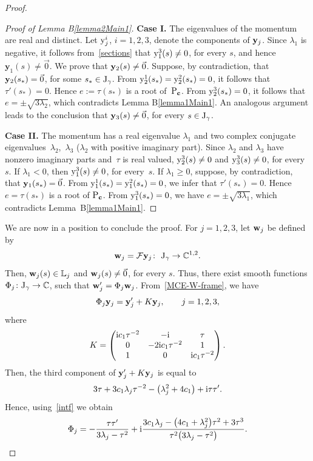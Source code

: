 \documentclass[10pt,a4paper]{amsart}
\numberwithin{equation}{section}
\def\C{\mathbb{C}}
\begin{document}
\begin{proof}
\begin{proof}[Proof of Lemma B\ref{lemma2Main1}]
{\bf Case I.} The eigenvalues of the momentum are real and distinct. Let ${\rm y}_j^i$, $i=1,2,3$, denote
the components of ${\bf y}_j$. Since $\lambda_1$ is negative, it follows from~\eqref{sections} that ${\rm y}^3_1(s)\neq 0$,
for every $s$, and hence $\mathbf{y}_1(s)\neq \vec{0}$. We prove that {${\bf y}_2(s)\neq \vec{0}$.
Suppose, by contradiction, that ${\bf y}_2(s_*)=\vec{0}$}, for some $s_*\in {\rm J}_{\gamma}$.
From ${\rm y}^1_2(s_*)={\rm y}^2_2(s_*)=0$, it follows that {$\tau'(s_*)=0$}.
Hence $e:=\tau(s_*)$ is a root of~${\rm P}_{{\bf c}}$. From ${\rm y}^3_2(s_*)=0$,
it follows that $e=\pm \sqrt{3\lambda_2}$, which contradicts Lemma B\ref{lemma1Main1}. An analogous argument leads to
the conclusion that ${\bf y}_3(s)\neq \vec{0}$, for every $s\in {\rm J}_{\gamma}$.

{\bf Case II.} The momentum has a real eigenvalue $\lambda_1$ and two complex conjugate eigenvalues~$\lambda_2$,~$\lambda_3$
($\lambda_2$ with positive imaginary part).
Since $\lambda_2$ and $\lambda_3$ have nonzero imaginary parts and~$\tau$ is real valued,
${\rm y}_2^3(s)\neq 0$ and ${\rm y}_3^3(s)\neq 0$, for every $s$. If $\lambda_1<0$, then ${\rm y}_1^3(s)\neq 0$,
for every~$s$.
If $\lambda_1\ge 0$, suppose, by contradiction, that ${\bf y}_1(s_*)=\vec{0}$.
From ${\rm y}_1^1(s_*)={\rm y}^2_1(s_*)=0$,
we infer that $\tau'(s_*)=0$. Hence $e=\tau(s_*)$ is a root of ${\rm P}_{{\bf c}}$.
From ${\rm y}^3_1(s_*)=0$, we have $e=\pm \sqrt{3\lambda_1}$, which contradicts Lemma~B\ref{lemma1Main1}.
\end{proof}

We are now in a position to conclude the proof. For $j=1,2,3$, let ${\bf w}_j$ be defined by
\[
 {\bf w}_j={\mathcal F}{\bf y}_j\colon \ {\rm J}_{\gamma}\to \C^{1,2}.
\]
Then, ${\bf w}_j(s)\in {\mathbb L}_j$ and ${\bf w}_j(s)\neq \vec{0}$, for every $s$.
Thus, there exist smooth functions $\Phi_j\colon{\rm J}_{\gamma}\to \C$, such that
${\bf w}'_j=\Phi_j {\bf w}_j$. From~\eqref{MCE-W-frame}, we have
\begin{equation}\label{intf}
 \Phi_j {\bf y}_j={\bf y}'_j+K{\bf y}_j,\qquad j=1,2,3,
 \end{equation}
where
\[
K= \begin{pmatrix}
{\rm i}c_1\tau^{-2} & -{\rm i} & \tau\\
0 &-2{\rm i}c_1\tau^{-2} & 1 \\
1 & 0&{\rm i}c_1\tau^{-2}\\
 \end{pmatrix}.
\]
Then, the third component of ${\bf y}'_j+K{\bf y}_j$ is equal to
\[
 3\tau+3c_1\lambda_j\tau^{-2}-\big(\lambda_j^2+4c_1\big)+{\rm i}\tau{\tau}'.
\]
Hence, using~\eqref{intf} we obtain
\begin{equation}\label{intf2}
 \Phi_j=-\frac{\tau \tau'}{3\lambda_j-\tau^2}
 +{\rm i}\frac{3c_1\lambda_j-\big(4c_1+\lambda_j^2\big)\tau^2+3\tau^3}{\tau^2\big(3\lambda_j-\tau^2\big)}.
 \end{equation}


\end{proof}
\end{document}
